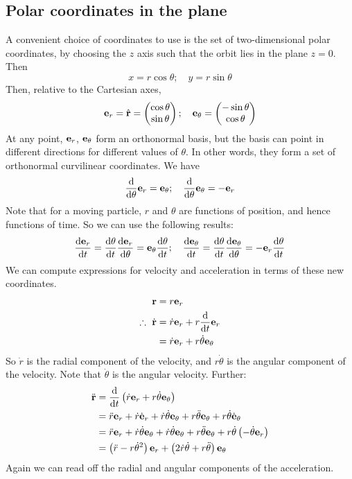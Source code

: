 \subsection{Polar coordinates in the plane}
A convenient choice of coordinates to use is the set of two-dimensional polar coordinates, by choosing the \(z\) axis such that the orbit lies in the plane \(z=0\).
Then
\[
	x = r\cos\theta;\quad y = r\sin\theta
\]
Then, relative to the Cartesian axes,
\[
	\vb e_r = \hat{\vb{r}} = \begin{pmatrix}
		\cos\theta \\ \sin\theta
	\end{pmatrix};\quad \vb e_\theta = \begin{pmatrix}
		-\sin\theta \\ \cos\theta
	\end{pmatrix}
\]
At any point, \(\vb e_r\), \(\vb e_\theta\) form an orthonormal basis, but the basis can point in different directions for different values of \(\theta\).
In other words, they form a set of orthonormal curvilinear coordinates.
We have
\[
	\frac{\dd}{\dd{\theta}}\vb e_r = \vb e_\theta;\quad \frac{\dd}{\dd{\theta}}\vb e_\theta = -\vb e_r
\]
Note that for a moving particle, \(r\) and \(\theta\) are functions of position, and hence functions of time.
So we can use the following results:
\[
	\frac{\dd \vb e_r}{\dd{t}} = \frac{\dd{\theta}}{\dd{t}} \frac{\dd \vb e_r}{\dd{\theta}} = \vb e_\theta \frac{\dd{\theta}}{\dd{t}};\quad \frac{\dd \vb e_\theta}{\dd{t}} = \frac{\dd{\theta}}{\dd{t}} \frac{\dd \vb e_\theta}{\dd{\theta}} = -\vb e_r \frac{\dd{\theta}}{\dd{t}}
\]
We can compute expressions for velocity and acceleration in terms of these new coordinates.
\begin{align*}
	\vb r                  & = r \vb e_r                                    \\
	\therefore\ \dot{\vb r} & = \dot r \vb e_r + r \frac{\dd}{\dd{t}}\vb e_r \\
	                       & = \dot r \vb e_r + r \dot\theta \vb e_\theta
\end{align*}
So \(\dot r\) is the radial component of the velocity, and \(r\dot\theta\) is the angular component of the velocity.
Note that \(\dot\theta\) is the angular velocity.
Further:
\begin{align*}
	\ddot{\vb r} & = \frac{\dd}{\dd{t}}\left( \dot r \vb e_r + r \dot \theta \vb e_\theta \right)                                                                                        \\
	             & = \ddot r \vb e_r + \dot r \dot{\vb e}_r + \dot r \dot \theta \vb e_\theta + r \ddot \theta \vb e_\theta + r \dot \theta \dot{\vb e}_\theta                           \\
	             & = \ddot r \vb e_r + \dot r \dot \theta \vb e_\theta + \dot r \dot \theta \vb e_\theta + r \ddot \theta \vb e_\theta + r \dot \theta \left(-\dot \theta \vb e_r\right) \\
	             & = \left(\ddot r - r \dot \theta^2\right) \vb e_r + \left(2\dot r\dot \theta + r\ddot \theta\right) \vb e_\theta
\end{align*}
Again we can read off the radial and angular components of the acceleration.


